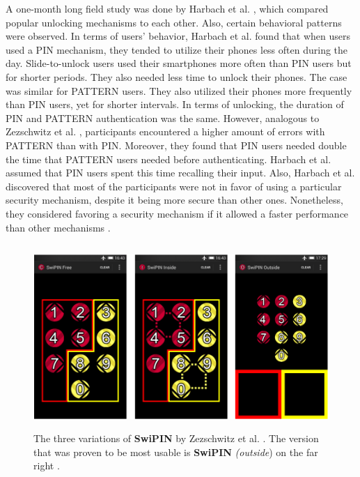 A one-month long field study was done by Harbach et al. \cite{AnatomySmartphone}, which compared popular unlocking mechanisms to each other. Also, certain behavioral patterns were observed. In terms of users' behavior, Harbach et al. \cite{AnatomySmartphone} found that when users used a PIN mechanism, they tended to utilize their phones less often during the day. Slide-to-unlock users used their smartphones more often than PIN users but for shorter periods. They also needed less time to unlock their phones. The case was similar for PATTERN users. They also utilized their phones more frequently than PIN users, yet for shorter intervals. In terms of unlocking, the duration of PIN and PATTERN authentication was the same. However, analogous to Zezschwitz et al. \cite{PatternWild}, participants encountered a higher amount of errors with PATTERN than with PIN.
Moreover, they found that PIN users needed double the time that PATTERN users needed before authenticating. Harbach et al. \cite{AnatomySmartphone} assumed that PIN users spent this time recalling their input. Also, Harbach et al. \cite{AnatomySmartphone} discovered that most of the participants were not in favor of using a particular security mechanism, despite it being more secure than other ones. Nonetheless, they considered favoring a security mechanism if it allowed a faster performance than other mechanisms \cite{AnatomySmartphone,Albayram:2017:BUL:3235924.3235929}.

\begin{figure}[t!]
\centering
\includegraphics[width=13cm, height=7cm]{Chapters/graphics/swipin.PNG}
\caption{The three variations of \textbf{SwiPIN} by Zezschwitz et al. \cite{Swipin}. The version that was proven to be most usable is \textbf{SwiPIN} \textit{(outside}) on the far right \cite{Swipin}. }
\label{fig:swipin}
\end{figure}


